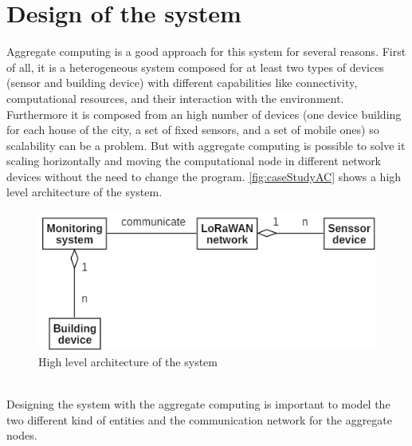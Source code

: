 \section{Design of the system}

Aggregate computing is a good approach for this system for several reasons.
First of all, it is a heterogeneous system composed for at least two types of devices (sensor and building device) with different capabilities like connectivity, computational resources, and their interaction with the environment. 
Furthermore it is composed from an high number of devices (one device building for each house of the city, a set of fixed sensors, and a set of mobile ones) so scalability can be a problem. But with aggregate computing is possible to solve it scaling horizontally and moving the computational node in different network devices without the need to change the program.
\autoref{fig:caseStudyAC} shows a high level architecture of the system.
\begin{figure}[h]
    \centering
    \includegraphics{figures/caseStudyB_high.png}
    \caption{High level architecture of the system}
    \label{fig:caseStudyAC}
\end{figure}
\\Designing the system with the aggregate computing is important to model the two different kind of entities and the communication network for the aggregate nodes.

